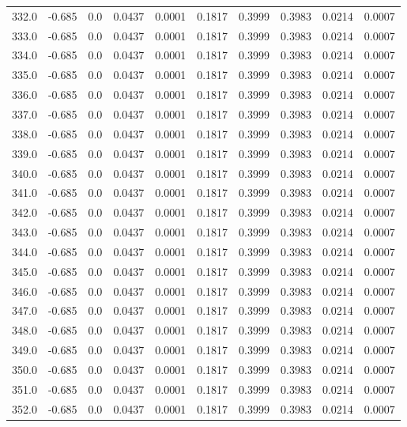 \begin{longtable}{lrrrrrrrrr}
332.0 & -0.685 & 0.0 & 0.0437 & 0.0001 & 0.1817 & 0.3999 & 0.3983 & 0.0214 & 0.0007 \\
333.0 & -0.685 & 0.0 & 0.0437 & 0.0001 & 0.1817 & 0.3999 & 0.3983 & 0.0214 & 0.0007 \\
334.0 & -0.685 & 0.0 & 0.0437 & 0.0001 & 0.1817 & 0.3999 & 0.3983 & 0.0214 & 0.0007 \\
335.0 & -0.685 & 0.0 & 0.0437 & 0.0001 & 0.1817 & 0.3999 & 0.3983 & 0.0214 & 0.0007 \\
336.0 & -0.685 & 0.0 & 0.0437 & 0.0001 & 0.1817 & 0.3999 & 0.3983 & 0.0214 & 0.0007 \\
337.0 & -0.685 & 0.0 & 0.0437 & 0.0001 & 0.1817 & 0.3999 & 0.3983 & 0.0214 & 0.0007 \\
338.0 & -0.685 & 0.0 & 0.0437 & 0.0001 & 0.1817 & 0.3999 & 0.3983 & 0.0214 & 0.0007 \\
339.0 & -0.685 & 0.0 & 0.0437 & 0.0001 & 0.1817 & 0.3999 & 0.3983 & 0.0214 & 0.0007 \\
340.0 & -0.685 & 0.0 & 0.0437 & 0.0001 & 0.1817 & 0.3999 & 0.3983 & 0.0214 & 0.0007 \\
341.0 & -0.685 & 0.0 & 0.0437 & 0.0001 & 0.1817 & 0.3999 & 0.3983 & 0.0214 & 0.0007 \\
342.0 & -0.685 & 0.0 & 0.0437 & 0.0001 & 0.1817 & 0.3999 & 0.3983 & 0.0214 & 0.0007 \\
343.0 & -0.685 & 0.0 & 0.0437 & 0.0001 & 0.1817 & 0.3999 & 0.3983 & 0.0214 & 0.0007 \\
344.0 & -0.685 & 0.0 & 0.0437 & 0.0001 & 0.1817 & 0.3999 & 0.3983 & 0.0214 & 0.0007 \\
345.0 & -0.685 & 0.0 & 0.0437 & 0.0001 & 0.1817 & 0.3999 & 0.3983 & 0.0214 & 0.0007 \\
346.0 & -0.685 & 0.0 & 0.0437 & 0.0001 & 0.1817 & 0.3999 & 0.3983 & 0.0214 & 0.0007 \\
347.0 & -0.685 & 0.0 & 0.0437 & 0.0001 & 0.1817 & 0.3999 & 0.3983 & 0.0214 & 0.0007 \\
348.0 & -0.685 & 0.0 & 0.0437 & 0.0001 & 0.1817 & 0.3999 & 0.3983 & 0.0214 & 0.0007 \\
349.0 & -0.685 & 0.0 & 0.0437 & 0.0001 & 0.1817 & 0.3999 & 0.3983 & 0.0214 & 0.0007 \\
350.0 & -0.685 & 0.0 & 0.0437 & 0.0001 & 0.1817 & 0.3999 & 0.3983 & 0.0214 & 0.0007 \\
351.0 & -0.685 & 0.0 & 0.0437 & 0.0001 & 0.1817 & 0.3999 & 0.3983 & 0.0214 & 0.0007 \\
352.0 & -0.685 & 0.0 & 0.0437 & 0.0001 & 0.1817 & 0.3999 & 0.3983 & 0.0214 & 0.0007 \\

\end{longtable}
